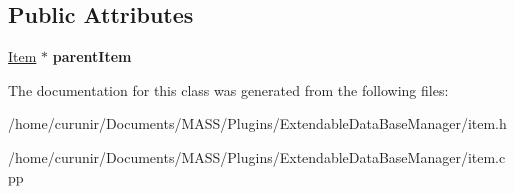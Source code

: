 \subsection*{Public Attributes}
\begin{DoxyCompactItemize}
\item 
\hyperlink{class_item}{Item} $\ast$ {\bfseries parent\+Item}\hypertarget{class_item_ac5078a594ac17181e0ee2d90c63e9aa1}{}\label{class_item_ac5078a594ac17181e0ee2d90c63e9aa1}

\end{DoxyCompactItemize}


The documentation for this class was generated from the following files\+:\begin{DoxyCompactItemize}
\item 
/home/curunir/\+Documents/\+M\+A\+S\+S/\+Plugins/\+Extendable\+Data\+Base\+Manager/item.\+h\item 
/home/curunir/\+Documents/\+M\+A\+S\+S/\+Plugins/\+Extendable\+Data\+Base\+Manager/item.\+cpp\end{DoxyCompactItemize}
